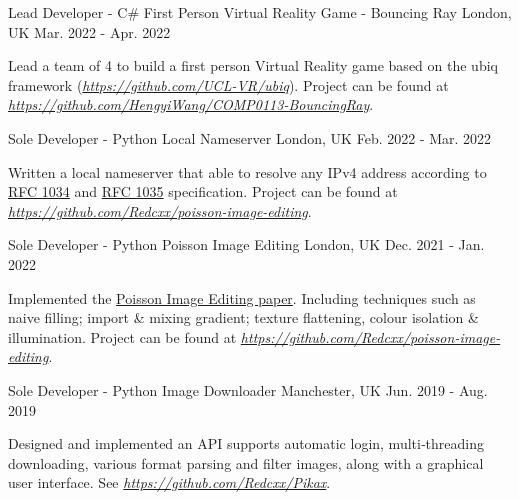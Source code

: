 \begin{cventries}
  \cventry
    {Lead Developer - C\#} %
    {First Person Virtual Reality Game - Bouncing Ray} %
    {London, UK} %
    {Mar. 2022 - Apr. 2022} %
    {
      \begin{cvitems} %
        \item {Lead a team of 4 to build a first person Virtual Reality game based on the ubiq framework (\href{https://github.com/UCL-VR/ubiq}{\textit{https://github.com/UCL-VR/ubiq}}). Project can be found at \href{https://github.com/HengyiWang/COMP0113-BouncingRay}{\textit{https://github.com/HengyiWang/COMP0113-BouncingRay}}.}
      \end{cvitems}
    }
  
  \cventry
    {Sole Developer - Python} %
    {Local Nameserver} %
    {London, UK} %
    {Feb. 2022 - Mar. 2022} %
    {
      \begin{cvitems} %
        \item {Written a local nameserver that able to resolve any IPv4 address according to \href{https://datatracker.ietf.org/doc/html/rfc1034}{RFC 1034} and \href{https://datatracker.ietf.org/doc/html/rfc1035}{RFC 1035} specification. Project can be found at \href{https://github.com/Redcxx/poisson-image-editing}{\textit{https://github.com/Redcxx/poisson-image-editing}}.}
      \end{cvitems}
    }
    
  \cventry
    {Sole Developer - Python} %
    {Poisson Image Editing} %
    {London, UK} %
    {Dec. 2021 - Jan. 2022} %
    {
      \begin{cvitems} %
        \item {Implemented the \href{https://www.cs.jhu.edu/~misha/Fall07/Papers/Perez03.pdf}{Poisson Image Editing paper}. Including techniques such as naive filling; import \& mixing gradient; texture flattening, colour isolation \& illumination.  Project can be found at \href{https://github.com/Redcxx/poisson-image-editing}{\textit{https://github.com/Redcxx/poisson-image-editing}}.}
      \end{cvitems}
    }

  \cventry
    {Sole Developer - Python} %
    {Image Downloader} %
    {Manchester, UK} %
    {Jun. 2019 - Aug. 2019} %
    {
      \begin{cvitems} %
        \item {Designed and implemented an API supports automatic login, multi‑threading downloading, various format parsing and filter images, along with a graphical user interface. See \href{https://github.com/Redcxx/Pikax}{\textit{https://github.com/Redcxx/Pikax}}.}
      \end{cvitems}
    }
    

\end{cventries}

